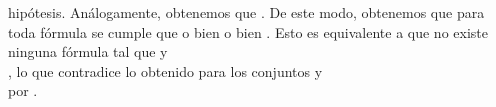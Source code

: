 \begin{isabellebody}
\begin{isamarkuptext}
\begin{demostracion}
  hipótesis. Análogamente, obtenemos que . De este modo, obtenemos que para 
  toda fórmula  se cumple que o bien  o bien . 
  Esto es equivalente a que no existe ninguna fórmula  tal que  y\\ 
  , lo que contradice lo obtenido para los conjuntos  y\\  
  por \isa{{\isasymone}{\isacharparenright}}.


\end{demostracion}
\end{isamarkuptext}
\end{isabellebody}

